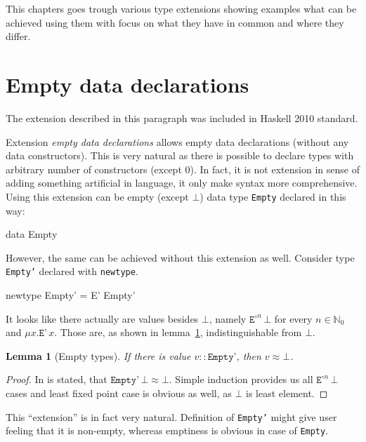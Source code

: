 \documentclass[11pt,oneside,draft]{fithesis2}
\newtheorem{lemma}{Lemma}
\begin{document}
This chapters goes trough various type extensions showing examples
what can be achieved using them with focus on what they have in common
and where they differ.

\section{Empty data declarations}

The extension described in this paragraph was included in Haskell 2010 standard.

Extension \emph{empty data declarations} allows empty data declarations
(without any data constructors). This is very natural as there is possible
to declare types with arbitrary number of constructors (except 0). In
fact, it is not extension in sense of adding something artificial in
language, it only make syntax more comprehensive. Using this extension can
be empty (except \(\bot\)) data type \texttt{Empty} declared in this way:
\begin{code}
data Empty
\end{code}
However, the same can be achieved without this extension as well. Consider type \texttt{Empty'}
declared with \texttt{newtype}.
\begin{code}
newtype Empty' = E' Empty'
\end{code}
It looks like there actually are values besides \(\bot\), namely \(\texttt{E'}^n \, \bot\)
for every \(n \in \mathbb{N}_0\) and \(\mu x . \texttt{E'} \, x\).
Those are, as shown in lemma~\ref{emptyTypes}, indistinguishable from \(\bot\).

\begin{lemma}[Empty types]
\label{emptyTypes}
If there is value \(v :: \texttt{Empty'}\), then \(v \approx \bot\).
\end{lemma}

\begin{proof}
In \cite{haskell2010} is stated, that \(\texttt{Empty'} \, \bot \approx \bot\).
Simple induction provides us all \(\texttt{E'}^n \, \bot\) cases
and least fixed point case is obvious as well, as \(\bot\) is least element.
\end{proof}

This ``extension'' is in fact very natural. Definition of \texttt{Empty'}
might give user feeling that it is non-empty, whereas emptiness is
obvious in case of \texttt{Empty}.
\end{document}
